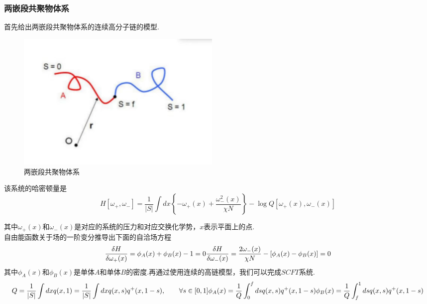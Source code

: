 \documentclass[12pt]{article}
\begin{document}
\begin{CJK}{UTF8}{gkai}
    \subsubsection{两嵌段共聚物体系}
    
      首先给出两嵌段共聚物体系的连续高分子链的模型.\\
      
    \begin{figure}[H] 
     \centering
     \includegraphics[width=10cm]{scft.jpg}
     \caption{两嵌段共聚物体系}
    \end{figure}
    
    该系统的哈密顿量是\\
    \begin{equation}
    H[\omega_+,\omega_-]=\frac{1}{|S|}\int dx\left\lbrace -\omega_+(x)+\frac{\omega_{-}^2(x)}{\chi N}\right\rbrace -\log Q[\omega_+(x),\omega_-(x)]	
    \end{equation}
    
    
    其中$\omega_+(x)$和$\omega_-(x)$是对应的系统的压力和对应交换化学势，$x$表示平面上的点.\\
    
    自由能函数关于场的一阶变分推导出下面的自洽场方程\\

  \begin{equation}
    \frac{\delta H}{\delta \omega_+(x)}=\phi _A(x)+\phi _B(x)-1=0 \\   
    \frac{\delta H}{\delta \omega_-(x)}=\frac{2\omega_-(x)}{\chi N}-[\phi _A(x)-\phi _B(x)]=0
   \end{equation}
   其中$\phi _A(x)$和$\phi _B(x)$是单体$A$和单体$B$的密度.再通过使用连续的高链模型，我们可以完成$SCFT$系统. 
  \begin{equation}
    Q=\frac{1}{|S|}\int dx q(x,1)=\frac{1}{|S|}\int dx q(x,s)q^{+}(x,1-s),\qquad \forall s \in[0,1]  \\
   \phi _A(x)=\frac{1}{Q}\int_0^f ds q(x,s)q^{+}(x,1-s)\\
   \phi _B(x)=\frac{1}{Q}\int_f^1 ds q(x,s)q^{+}(x,1-s)
    \end{equation}
    

\end{CJK}
\end{document}
